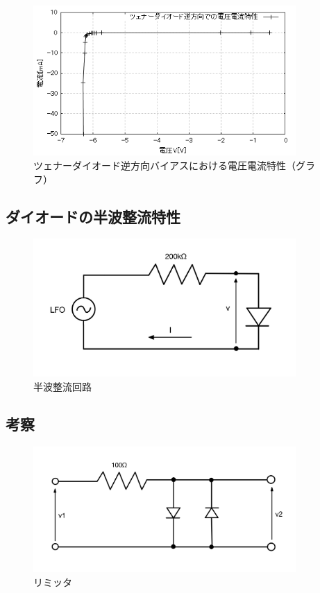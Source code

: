 \documentclass[titlepage]{jarticle}
\begin{document}
\begin{figure}[H]
    \begin{center}
        \includegraphics[width=10cm]{graph/4.png}
        \caption{ツェナーダイオード逆方向バイアスにおける電圧電流特性（グラフ）}
        \label{fig:ツェナーダイオード逆方向バイアスにおける電圧電流特性（グラフ）}
    \end{center}
\end{figure}

\subsection{ダイオードの半波整流特性}
\begin{figure}[H]
    \begin{center}
        \includegraphics[width=10cm]{image/lfo.jpg}
        \caption{半波整流回路}
        \label{fig:半波整流回路}
    \end{center}
\end{figure}

\subsection{考察}
\begin{figure}[H]
    \begin{center}
        \includegraphics[width=10cm]{image/limmit.jpg}
        \caption{リミッタ}
        \label{fig:リミッタ}
    \end{center}
\end{figure}
\end{document}
